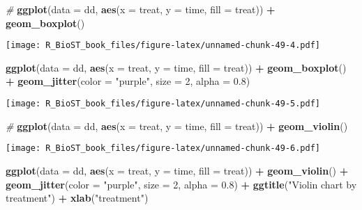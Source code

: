 \documentclass[
]{book}
\newenvironment{Shaded}{\begin{snugshade}}{\end{snugshade}}
\newcommand{\CommentTok}[1]{\textcolor[rgb]{0.56,0.35,0.01}{\textit{#1}}}
\newcommand{\DataTypeTok}[1]{\textcolor[rgb]{0.13,0.29,0.53}{#1}}
\newcommand{\DecValTok}[1]{\textcolor[rgb]{0.00,0.00,0.81}{#1}}
\newcommand{\FloatTok}[1]{\textcolor[rgb]{0.00,0.00,0.81}{#1}}
\newcommand{\KeywordTok}[1]{\textcolor[rgb]{0.13,0.29,0.53}{\textbf{#1}}}
\newcommand{\NormalTok}[1]{#1}
\newcommand{\OperatorTok}[1]{\textcolor[rgb]{0.81,0.36,0.00}{\textbf{#1}}}
\newcommand{\StringTok}[1]{\textcolor[rgb]{0.31,0.60,0.02}{#1}}
\begin{document}
\begin{Shaded}
\begin{Highlighting}[]
\CommentTok{\#}
\KeywordTok{ggplot}\NormalTok{(}\DataTypeTok{data =}\NormalTok{ dd, }\KeywordTok{aes}\NormalTok{(}\DataTypeTok{x =}\NormalTok{ treat, }\DataTypeTok{y =}\NormalTok{ time, }\DataTypeTok{fill =}\NormalTok{ treat)) }\OperatorTok{+}
\StringTok{    }\KeywordTok{geom\_boxplot}\NormalTok{()}
\end{Highlighting}
\end{Shaded}

\texttt{[image: R\_BioST\_book\_files/figure-latex/unnamed-chunk-49-4.pdf]}

\begin{Shaded}
\begin{Highlighting}[]
\KeywordTok{ggplot}\NormalTok{(}\DataTypeTok{data =}\NormalTok{ dd, }\KeywordTok{aes}\NormalTok{(}\DataTypeTok{x =}\NormalTok{ treat, }\DataTypeTok{y =}\NormalTok{ time, }\DataTypeTok{fill =}\NormalTok{ treat)) }\OperatorTok{+}
\StringTok{    }\KeywordTok{geom\_boxplot}\NormalTok{() }\OperatorTok{+}
\StringTok{    }\KeywordTok{geom\_jitter}\NormalTok{(}\DataTypeTok{color =} \StringTok{"purple"}\NormalTok{, }\DataTypeTok{size =} \DecValTok{2}\NormalTok{, }\DataTypeTok{alpha =} \FloatTok{0.8}\NormalTok{)}
\end{Highlighting}
\end{Shaded}

\texttt{[image: R\_BioST\_book\_files/figure-latex/unnamed-chunk-49-5.pdf]}

\begin{Shaded}
\begin{Highlighting}[]
\CommentTok{\#}
\KeywordTok{ggplot}\NormalTok{(}\DataTypeTok{data =}\NormalTok{ dd, }\KeywordTok{aes}\NormalTok{(}\DataTypeTok{x =}\NormalTok{ treat, }\DataTypeTok{y =}\NormalTok{ time, }\DataTypeTok{fill =}\NormalTok{ treat)) }\OperatorTok{+}
\StringTok{    }\KeywordTok{geom\_violin}\NormalTok{()}
\end{Highlighting}
\end{Shaded}

\texttt{[image: R\_BioST\_book\_files/figure-latex/unnamed-chunk-49-6.pdf]}

\begin{Shaded}
\begin{Highlighting}[]
\KeywordTok{ggplot}\NormalTok{(}\DataTypeTok{data =}\NormalTok{ dd, }\KeywordTok{aes}\NormalTok{(}\DataTypeTok{x =}\NormalTok{ treat, }\DataTypeTok{y =}\NormalTok{ time, }\DataTypeTok{fill =}\NormalTok{ treat)) }\OperatorTok{+}
\StringTok{    }\KeywordTok{geom\_violin}\NormalTok{() }\OperatorTok{+}
\StringTok{    }\KeywordTok{geom\_jitter}\NormalTok{(}\DataTypeTok{color =} \StringTok{"purple"}\NormalTok{, }\DataTypeTok{size =} \DecValTok{2}\NormalTok{, }\DataTypeTok{alpha =} \FloatTok{0.8}\NormalTok{) }\OperatorTok{+}\StringTok{ }
\StringTok{  }\KeywordTok{ggtitle}\NormalTok{(}\StringTok{"Violin chart by treatment"}\NormalTok{) }\OperatorTok{+}
\StringTok{    }\KeywordTok{xlab}\NormalTok{(}\StringTok{"treatment"}\NormalTok{)}
\end{Highlighting}
\end{Shaded}
\end{document}
